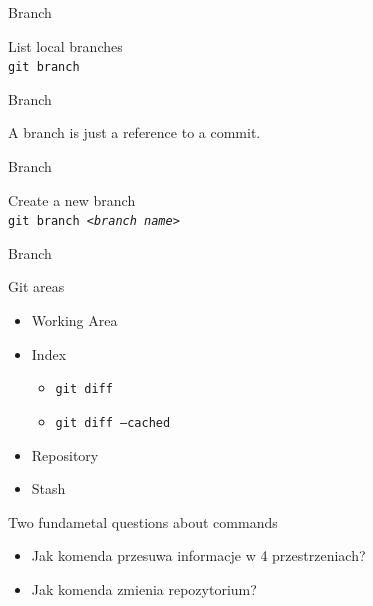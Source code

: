 \documentclass{beamer}
\begin{document}

    \begin{frame}{Branch}
        \begin{center}
            List local branches\\[1em]
            \texttt{git branch}
        \end{center}
    \end{frame}

    \begin{frame}{Branch}
        \begin{center}
            A branch is just a reference to a commit.
        \end{center}
    \end{frame}

    \begin{frame}{Branch}
        \begin{center}
            Create a new branch\\[1em]
            \texttt{git branch \textsl{<branch name>}}
        \end{center}
    \end{frame}

    \begin{frame}{Branch}
        \begin{center}
        \end{center}
    \end{frame}

    \begin{frame}{Git areas}
        \begin{itemize}[<+-| alert@+>]
            \item Working Area
            \item Index
            \begin{itemize}
                \item<2-> \texttt{git diff}
                \item<2-> \texttt{git diff --cached}
            \end{itemize}
            \item Repository
            \item Stash
        \end{itemize}
    \end{frame}

    \begin{frame}{Two fundametal questions about commands}
        \begin{itemize}[<+->]
            \item Jak komenda przesuwa informacje w 4 przestrzeniach?
            \item Jak komenda zmienia repozytorium?
        \end{itemize}
    \end{frame}
\end{document}
